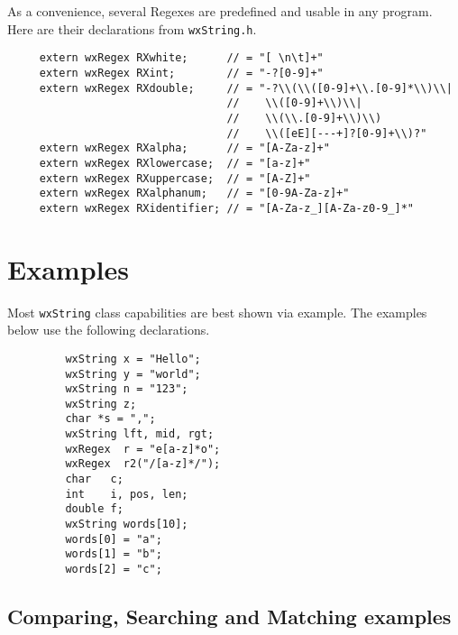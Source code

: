 As a convenience, several Regexes are predefined and usable in any
program. Here are their declarations from {\tt wxString.h}.
\begin{verbatim}
     extern wxRegex RXwhite;      // = "[ \n\t]+"
     extern wxRegex RXint;        // = "-?[0-9]+"
     extern wxRegex RXdouble;     // = "-?\\(\\([0-9]+\\.[0-9]*\\)\\|
                                  //    \\([0-9]+\\)\\|
                                  //    \\(\\.[0-9]+\\)\\)
                                  //    \\([eE][---+]?[0-9]+\\)?"
     extern wxRegex RXalpha;      // = "[A-Za-z]+"
     extern wxRegex RXlowercase;  // = "[a-z]+"
     extern wxRegex RXuppercase;  // = "[A-Z]+"
     extern wxRegex RXalphanum;   // = "[0-9A-Za-z]+"
     extern wxRegex RXidentifier; // = "[A-Za-z_][A-Za-z0-9_]*"
\end{verbatim}

\section{Examples}

Most {\tt wxString} class capabilities are best shown via example.  The
examples below use the following declarations.
\begin{verbatim}
         wxString x = "Hello";
         wxString y = "world";
         wxString n = "123";
         wxString z;
         char *s = ",";
         wxString lft, mid, rgt;
         wxRegex  r = "e[a-z]*o";
         wxRegex  r2("/[a-z]*/");
         char   c;
         int    i, pos, len;
         double f;
         wxString words[10];
         words[0] = "a";
         words[1] = "b";
         words[2] = "c";
\end{verbatim}

\subsection{Comparing, Searching and Matching examples}

